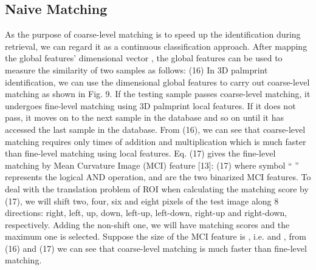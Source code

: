 \subsection{Naive Matching}
\label{ssec:methodology:naive}

As the purpose of coarse-level matching is to speed up the identification during retrieval, we can regard it as a continuous classification approach. After mapping the global features’   dimensional vector  , the global features can be used to measure the similarity of two samples as follows:
                              (16)
In 3D palmprint identification, we can use the   dimensional global features to carry out coarse-level matching as shown in Fig. 9. If the testing sample passes coarse-level matching, it undergoes fine-level matching using 3D palmprint local features. If it does not pass, it moves on to the next sample in the database and so on until it has accessed the last sample in the database. From (16), we can see that coarse-level matching requires only   times of addition and multiplication which is much faster than fine-level matching using local features. Eq. (17) gives the fine-level matching by Mean Curvature Image (MCI) feature [13]:
                              (17)
where symbol “ ” represents the logical AND operation,   and   are the two binarized MCI features. To deal with the translation problem of ROI when calculating the matching score by (17), we will shift two, four, six and eight pixels of the test image along 8 directions: right, left, up, down, left-up, left-down, right-up and right-down, respectively. Adding the non-shift one, we will have   matching scores and the maximum one is selected. Suppose the size of the MCI feature is  , i.e.   and  , from (16) and (17) we can see that coarse-level matching is much faster than fine-level matching.
